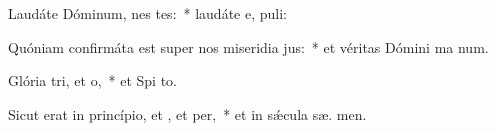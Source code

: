 \item Laudáte Dóminum, nes tes:~* laudáte e,  puli:
\item Quóniam confirmáta est super nos miseridia jus:~* et véritas Dómini ma  num.
\item Glória tri, et o,~* et Spi to.
\item Sicut erat in princípio, et , et per,~* et in sǽcula sæ. men.
